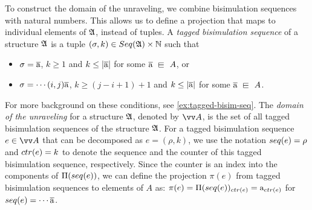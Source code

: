 To construct the domain of the unraveling, we combine bisimulation sequences with natural numbers.
This allows us to define a projection that maps to individual elements of ${\mathfrak{A}}$, instead of tuples.
A \emph{tagged bisimulation sequence} of a structure ${\mathfrak{A}}$ is a tuple $(\sigma, k) \in \Seq{A} \times \mathbb{N}$ such that
\begin{itemize}
  \item $\sigma = \overline{\mathrm{a}}$, $k \ge 1$ and $k \le |\overline{\mathrm{a}}|$ for some $\elemtuplea \sqin A$, or
  \item $\sigma = \cdots (i,j) \overline{\mathrm{a}}$, $k \ge (j-i+1) + 1$ and $k \le |\overline{\mathrm{a}}|$ for some $\elemtuplea \sqin A$.
\end{itemize}
For more background on these conditions, see \cref{ex:tagged-bisim-seq}.
The \emph{domain of the unraveling} for a structure ${\mathfrak{A}}$, denoted by $\unraveldom{A}$, is the set of all tagged bisimulation sequences of the structure ${\mathfrak{A}}$.
For a tagged bisimulation sequence $e \in \unraveldom{A}$ that can be decomposed as $e = (\rho, k)$, we use the notation $\seq{e} = \rho$ and $\ctr{e} = k$ to denote the sequence and the counter of this tagged bisimulation sequence, respectively.
Since the counter is an index into the components of $\Pi(\seq{e})$, we can define the projection $\pi(e)$ from tagged bisimulation sequences to elements of $A$ as: $\pi(e) = \Pi(\seq{e})_{\ctr{e}} = \elema_{\ctr{e}}$ for $\seq{e} = \cdots\elemtuplea$.
